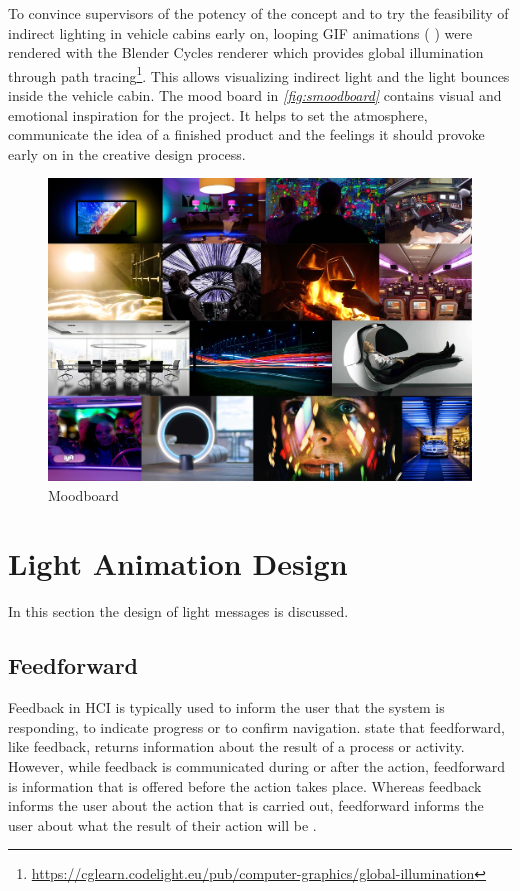 To convince supervisors of the potency of the concept and to try the feasibility of indirect lighting in vehicle cabins early on, looping GIF animations ( \emph{}) were rendered with the Blender Cycles renderer which provides global illumination through path tracing\footnote{\url{https://cglearn.codelight.eu/pub/computer-graphics/global-illumination}}. This allows visualizing indirect light and the light bounces inside the vehicle cabin. The mood board in \emph{\autoref{fig:smoodboard}} contains visual and emotional inspiration for the project. It helps to set the atmosphere, communicate the idea of a finished product and the feelings it should provoke early on in the creative design process\cite{Cassidy2011TheTool}. 

\begin{figure}
\centering
    \includegraphics[width=1.\textwidth]{fig/moodboard_G.jpg}
    \caption[Moodboard]{Moodboard}
    \label{fig:smoodboard}
\end{figure}
\section{Light Animation Design}
\label{sec:Lightdesign}
In this section the design of light messages is discussed.

\subsection{Feedforward}
\label{ssec:feedforward}
Feedback in HCI is typically used to inform the user that the system is responding, to indicate progress or to confirm navigation. \citet{Djajadiningrat2002ButHow} state that feedforward, like feedback, returns information about the result of a process or activity. However, while feedback is communicated during or after the action, feedforward is information that is offered before the action takes place. Whereas feedback informs the user about the action that is carried out, feedforward informs the user about what the result of their action will be \citep{Vermeulen2013CrossingExecution}.

